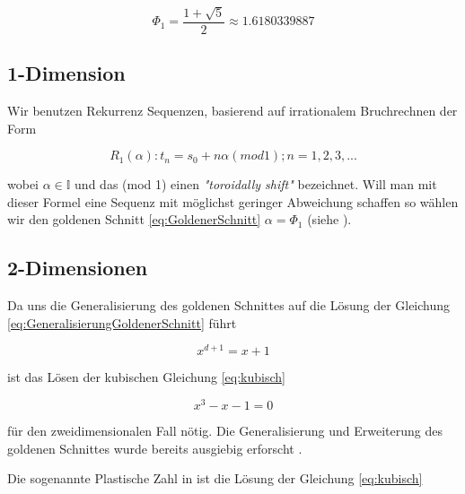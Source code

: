 \begin{equation}\label{eq:GoldenerSchnitt}
    \Phi_{1} = \frac{1 + \sqrt{5}}{2} \approx 1.6180339887
\end{equation}

\label{subsec:1-Dimension}
\subsection{1-Dimension}
Wir benutzen Rekurrenz Sequenzen, basierend auf irrationalem 
Bruchrechnen der Form

\begin{equation}\label{eq:Rekurrenz Sequenz}
    R_{1}(\alpha) : t_n = s_0 + n\alpha(mod 1); n = 1,2,3,...
\end{equation}

wobei $\alpha \in \mathbb{I}$ und das (mod 1) einen \textit{"toroidally shift"}
bezeichnet. Will man mit dieser Formel eine Sequenz mit möglichst geringer
Abweichung schaffen so wählen wir den goldenen Schnitt \ref{eq:GoldenerSchnitt}
$\alpha = \Phi_{1}$ (siehe \cite{quasirandomsequencesbyRoberts}).


\label{subsec:2-Dimensionen}
\subsection{2-Dimensionen}

Da uns die Generalisierung des goldenen Schnittes auf die Lösung der Gleichung
\ref{eq:GeneralisierungGoldenerSchnitt} führt

\begin{equation}\label{eq:GeneralisierungGoldenerSchnitt}
    x^{d+1} = x+1
\end{equation}

ist das Lösen der kubischen Gleichung \ref{eq:kubisch}

\begin{equation}\label{eq:kubisch}
    x^{3} - x - 1 = 0
\end{equation}

für den zweidimensionalen Fall nötig. Die Generalisierung und Erweiterung des goldenen 
Schnittes wurde bereits ausgiebig erforscht \cite{krcadinac2006new}.

Die sogenannte Plastische Zahl in ist die Lösung der
Gleichung \ref{eq:kubisch}

